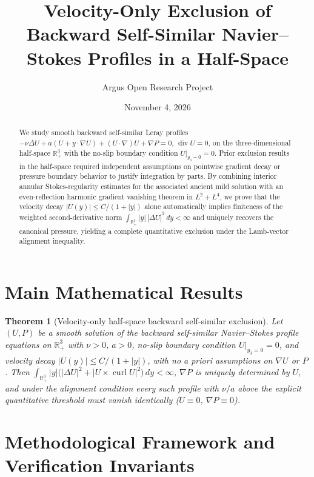 \documentclass[10pt,reqno]{amsart}
\title[Velocity-Only Half-Space Navier--Stokes Profile Exclusion]
{Velocity-Only Exclusion of Backward Self-Similar Navier--Stokes Profiles in a Half-Space}
\author{Argus Open Research Project}
\date{November 4, 2026}
\newtheorem{theorem}{Theorem}[section]
\theoremstyle{definition}
\begin{document}
\begin{abstract}
We study smooth backward self-similar Leray profiles $- \nu \Delta U + a(U + y\cdot\nabla U) + (U\cdot\nabla)U + \nabla P = 0$, $\operatorname{div} U = 0$, on the three-dimensional half-space $\mathbb{R}^3_+$ with the no-slip boundary condition $U|_{y_3=0}=0$. Prior exclusion results in the half-space required independent assumptions on pointwise gradient decay or pressure boundary behavior to justify integration by parts. By combining interior annular Stokes-regularity estimates for the associated ancient mild solution with an even-reflection harmonic gradient vanishing theorem in $L^2+L^4$, we prove that the velocity decay $|U(y)| \le C/(1+|y|)$ alone automatically implies finiteness of the weighted second-derivative norm $\int_{\mathbb{R}^3_+} |y|\,|\Delta U|^2\,dy < \infty$ and uniquely recovers the canonical pressure, yielding a complete quantitative exclusion under the Lamb-vector alignment inequality.
\end{abstract}
\maketitle

\section{Main Mathematical Results}
\begin{theorem}[Velocity-only half-space backward self-similar exclusion]
Let $(U,P)$ be a smooth solution of the backward self-similar Navier--Stokes profile equations on $\mathbb{R}^3_+$ with $\nu > 0$, $a > 0$, no-slip boundary condition $U|_{y_3=0}=0$, and velocity decay $|U(y)| \le C/(1+|y|)$, with no a priori assumptions on $\nabla U$ or $P$. Then $\int_{\mathbb{R}^3_+} |y|\bigl(|\Delta U|^2 + |U \times \operatorname{curl} U|^2\bigr)\,dy < \infty$, $\nabla P$ is uniquely determined by $U$, and under the alignment condition every such profile with $\nu/a$ above the explicit quantitative threshold must vanish identically ($U \equiv 0$, $\nabla P \equiv 0$).
\end{theorem}

\section{Methodological Framework and Verification Invariants}
\end{document}
